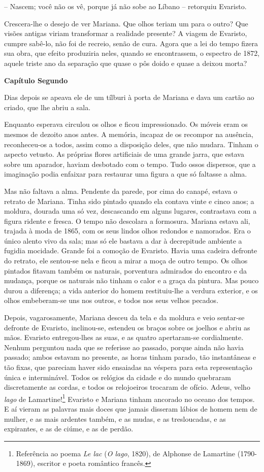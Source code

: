 -- Nascem; você não os vê, porque já não sobe ao Líbano -- retorquiu
Evaristo.

Crescera-lhe o desejo de ver Mariana. Que olhos teriam um para o outro?
Que visões antigas viriam transformar a realidade presente? A viagem de
Evaristo, cumpre sabê-lo, não foi de recreio, senão de cura. Agora que a
lei do tempo fizera sua obra, que efeito produziria neles, quando se
encontrassem, o espectro de 1872, aquele triste ano da separação que
quase o pôs doido e quase a deixou morta?

\textbf{Capítulo Segundo}

Dias depois se apeava ele de um tílburi à porta de Mariana e dava um
cartão ao criado, que lhe abriu a sala.

Enquanto esperava circulou os olhos e ficou impressionado. Os móveis
eram os mesmos de dezoito anos antes. A memória, incapaz de os recompor
na ausência, reconheceu-os a todos, assim como a disposição deles, que
não mudara. Tinham o aspecto vetusto. As próprias flores artificiais de
uma grande jarra, que estava sobre um aparador, haviam desbotado com o
tempo. Tudo ossos dispersos, que a imaginação podia enfaixar para
restaurar uma figura a que só faltasse a alma.

Mas não faltava a alma. Pendente da parede, por cima do canapé, estava o
retrato de Mariana. Tinha sido pintado quando ela contava vinte e cinco
anos; a moldura, dourada uma só vez, descascando em alguns lugares,
contrastava com a figura ridente e fresca. O tempo não descolara a
formosura. Mariana estava ali, trajada à moda de 1865, com os seus
lindos olhos redondos e namorados. Era o único alento vivo da sala; mas
só ele bastava a dar à decrepitude ambiente a fugidia mocidade. Grande
foi a comoção de Evaristo. Havia uma cadeira defronte do retrato, ele
sentou-se nela e ficou a mirar a moça de outro tempo. Os olhos pintados
fitavam também os naturais, porventura admirados do encontro e da
mudança, porque os naturais não tinham o calor e a graça da pintura. Mas
pouco durou a diferença; a vida anterior do homem restituiu-lhe a
verdura exterior, e os olhos embeberam-se uns nos outros, e todos nos
seus velhos pecados.

Depois, vagarosamente, Mariana desceu da tela e da moldura e veio
sentar-se defronte de Evaristo, inclinou-se, estendeu os braços sobre os
joelhos e abriu as mãos. Evaristo entregou-lhes as suas, e as quatro
apertaram-se cordialmente. Nenhum perguntou nada que se referisse ao
passado, porque ainda não havia passado; ambos estavam no presente, as
horas tinham parado, tão instantâneas e tão fixas, que pareciam haver
sido ensaiadas na véspera para esta representação única e interminável.
Todos os relógios da cidade e do mundo quebraram discretamente as
cordas, e todos os relojoeiros trocaram de ofício. Adeus, velho
\emph{lago} de Lamartine!\footnote{Referência ao poema \emph{Le lac}
  (\emph{O lago}, 1820), de Alphonse de Lamartine (1790-1869), escritor
  e poeta romântico francês.} Evaristo e Mariana tinham ancorado no
oceano dos tempos. E aí vieram as palavras mais doces que jamais
disseram lábios de homem nem de mulher, e as mais ardentes também, e as
mudas, e as tresloucadas, e as expirantes, e as de ciúme, e as de
perdão.

